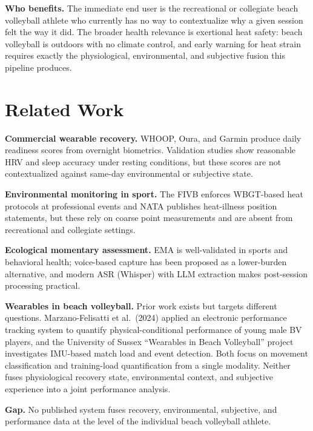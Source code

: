 \documentclass[sigconf,nonacm]{acmart}
\begin{document}
\textbf{Who benefits.} The immediate end user is the recreational or collegiate beach volleyball athlete who currently has no way to contextualize why a given session felt the way it did. The broader health relevance is exertional heat safety: beach volleyball is outdoors with no climate control, and early warning for heat strain requires exactly the physiological, environmental, and subjective fusion this pipeline produces.

\section{Related Work}

\textbf{Commercial wearable recovery.} WHOOP, Oura, and Garmin produce daily readiness scores from overnight biometrics. Validation studies show reasonable HRV and sleep accuracy under resting conditions, but these scores are not contextualized against same-day environmental or subjective state. %

\textbf{Environmental monitoring in sport.} The FIVB enforces WBGT-based heat protocols at professional events and NATA publishes heat-illness position statements, but these rely on coarse point measurements and are absent from recreational and collegiate settings.

\textbf{Ecological momentary assessment.} EMA is well-validated in sports and behavioral health; voice-based capture has been proposed as a lower-burden alternative, and modern ASR (Whisper) with LLM extraction makes post-session processing practical.

\textbf{Wearables in beach volleyball.} Prior work exists but targets different questions. Marzano-Felisatti et al.\ (2024) applied an electronic performance tracking system to quantify physical-conditional performance of young male BV players, and the University of Sussex ``Wearables in Beach Volleyball'' project investigates IMU-based match load and event detection. Both focus on movement classification and training-load quantification from a single modality. Neither fuses physiological recovery state, environmental context, and subjective experience into a joint performance analysis. %

\textbf{Gap.} No published system fuses recovery, environmental, subjective, and performance data at the level of the individual beach volleyball athlete.
\end{document}
